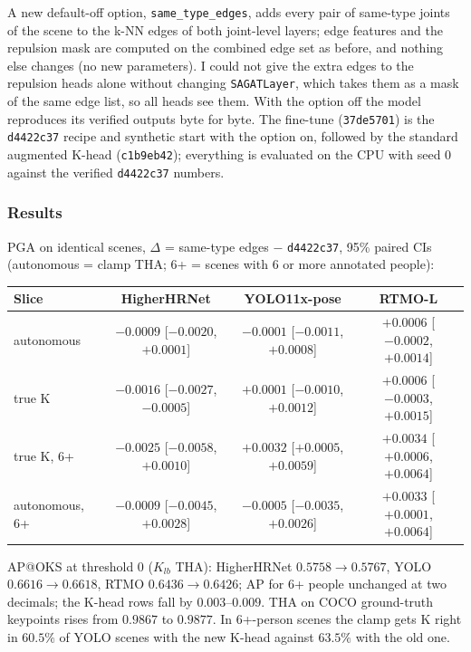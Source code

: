 A new default-off option, \texttt{same\_type\_edges}, adds every pair of same-type joints of the scene to the k-NN edges of both joint-level layers; edge features and the repulsion mask are computed on the combined edge set as before, and nothing else changes (no new parameters).
I could not give the extra edges to the repulsion heads alone without changing \texttt{SAGATLayer}, which takes them as a mask of the same edge list, so all heads see them.
With the option off the model reproduces its verified outputs byte for byte.
The fine-tune (\texttt{37de5701}) is the \texttt{d4422c37} recipe and synthetic start with the option on, followed by the standard augmented K-head (\texttt{c1b9eb42}); everything is evaluated on the CPU with seed 0 against the verified \texttt{d4422c37} numbers.

\subsubsection{Results}

PGA on identical scenes, $\Delta$ = same-type edges $-$ \texttt{d4422c37}, 95\% paired CIs (autonomous = clamp THA; 6+ = scenes with 6 or more annotated people):

{\small
\begin{tabular}{lccc}
\hline
\textbf{Slice} & \textbf{HigherHRNet} & \textbf{YOLO11x-pose} & \textbf{RTMO-L} \\
\hline
autonomous     & $-0.0009$ [$-0.0020$, $+0.0001$] & $-0.0001$ [$-0.0011$, $+0.0008$] & $+0.0006$ [$-0.0002$, $+0.0014$] \\
true K         & $-0.0016$ [$-0.0027$, $-0.0005$] & $+0.0001$ [$-0.0010$, $+0.0012$] & $+0.0006$ [$-0.0003$, $+0.0015$] \\
true K, 6+     & $-0.0025$ [$-0.0058$, $+0.0010$] & $+0.0032$ [$+0.0005$, $+0.0059$] & $+0.0034$ [$+0.0006$, $+0.0064$] \\
autonomous, 6+ & $-0.0009$ [$-0.0045$, $+0.0028$] & $-0.0005$ [$-0.0035$, $+0.0026$] & $+0.0033$ [$+0.0001$, $+0.0064$] \\
\hline
\end{tabular}
}

\vspace{0.5em}

AP@OKS at threshold 0 ($K_{lb}$ THA): HigherHRNet $0.5758 \rightarrow 0.5767$, YOLO $0.6616 \rightarrow 0.6618$, RTMO $0.6436 \rightarrow 0.6426$; AP for 6+ people unchanged at two decimals; the K-head rows fall by $0.003$--$0.009$.
THA on COCO ground-truth keypoints rises from $0.9867$ to $0.9877$.
In 6+-person scenes the clamp gets K right in $60.5\%$ of YOLO scenes with the new K-head against $63.5\%$ with the old one.

